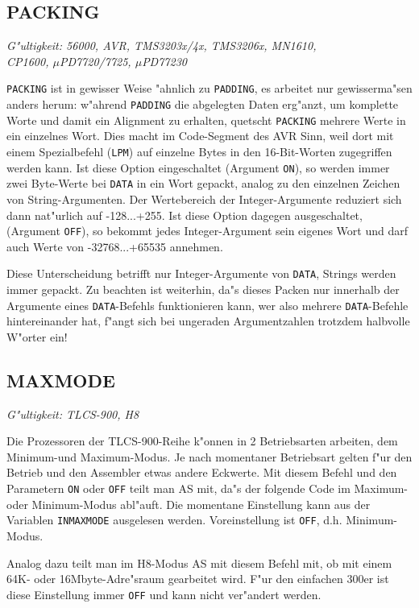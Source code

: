 \documentclass[12pt,a4paper,twoside]{report}
\makeatletter
\newcommand{\tty}[1]{{\tt #1}}
\newcommand{\ttindex}[1]{\index{#1@{\tt #1}}}
\newcommand{\asname}{AS}
\makeatother
\begin{document}
\subsection{PACKING}
\ttindex{PACKING}\label{SectPACKING}

{\em G"ultigkeit: 56000, AVR, TMS3203x/4x, TMS3206x, MN1610, \\
     CP1600, $\mu$PD7720/7725, $\mu$PD77230}

{\tt PACKING} ist in gewisser Weise "ahnlich zu {\tt PADDING}, es arbeitet
nur gewisserma"sen anders herum: w"ahrend {\tt PADDING} die
abgelegten Daten erg"anzt, um komplette Worte und damit ein Alignment zu
erhalten, quetscht {\tt PACKING} mehrere Werte in ein einzelnes Wort.
Dies macht im Code-Segment des AVR Sinn, weil dort mit einem Spezialbefehl
({\tt LPM}) auf einzelne Bytes in den 16-Bit-Worten zugegriffen werden
kann.  Ist diese Option eingeschaltet (Argument {\tt ON}), so werden immer
zwei Byte-Werte bei {\tt DATA} in ein Wort gepackt, analog zu den
einzelnen Zeichen von String-Argumenten.  Der Wertebereich der
Integer-Argumente reduziert sich dann nat"urlich auf -128...+255.  Ist
diese Option dagegen ausgeschaltet, (Argument {\tt OFF}), so bekommt
jedes Integer-Argument sein eigenes Wort und darf auch Werte von
-32768...+65535 annehmen.

Diese Unterscheidung betrifft nur Integer-Argumente von {\tt DATA},
Strings werden immer gepackt.  Zu beachten ist weiterhin, da"s dieses
Packen nur innerhalb der Argumente eines {\tt DATA}-Befehls funktionieren
kann, wer also mehrere {\tt DATA}-Befehle hintereinander hat, f"angt sich
bei ungeraden Argumentzahlen trotzdem halbvolle W"orter ein!


\subsection{MAXMODE}
\ttindex{MAXMODE}

{\em G"ultigkeit: TLCS-900, H8}

Die Prozessoren der TLCS-900-Reihe k"onnen in 2 Betriebsarten arbeiten,
dem Minimum-und Maximum-Modus.  Je nach momentaner Betriebsart gelten
f"ur den Betrieb und den Assembler etwas andere Eckwerte.  Mit diesem Befehl
und den Parametern \tty{ON} oder \tty{OFF} teilt man \asname{} mit, da"s der
folgende Code im Maximum- oder Minimum-Modus abl"auft.  Die momentane
Einstellung kann aus der Variablen \tty{INMAXMODE} ausgelesen werden.
Voreinstellung ist \tty{OFF}, d.h. Minimum-Modus.
\par
Analog dazu teilt man im H8-Modus \asname{} mit diesem Befehl mit, ob
mit einem 64K- oder 16Mbyte-Adre"sraum gearbeitet wird.  F"ur den
einfachen 300er ist diese Einstellung immer \tty{OFF} und kann nicht
ver"andert werden.
\end{document}
